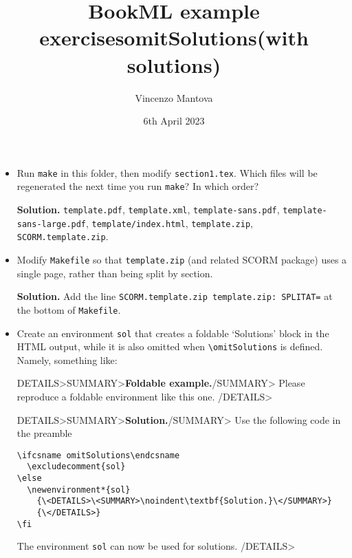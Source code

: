 \documentclass[oneside,11pt]{amsart}
\title{BookML example exercises\ifcsname omitSolutions\endcsname\else\space(with solutions)\fi}
\author{Vincenzo Mantova}
\date{6th April 2023}
\newenvironment*{sol}
    {\<DETAILS>\<SUMMARY>\noindent\textbf{Solution.}\</SUMMARY>}
    {\</DETAILS>}
\begin{document}
\maketitle

\begin{itemize}
  \item Run \texttt{make} in this folder, then modify \texttt{section1.tex}. Which files will be regenerated the next time you run \texttt{make}? In which order?

\begin{solution}
  \noindent\textbf{Solution.} \texttt{template.pdf}, \texttt{template.xml}, \texttt{template-sans.pdf}, \texttt{template-sans-large.pdf}, \texttt{template/index.html}, \texttt{template.zip}, \texttt{SCORM.template.zip}.
\end{solution}
  \item Modify \texttt{Makefile} so that \texttt{template.zip} (and related SCORM package) uses a single page, rather than being split by section.

\begin{solution}
  \noindent\textbf{Solution.} Add the line \texttt{SCORM.template.zip template.zip: SPLITAT=} at the bottom of \texttt{Makefile}.
\end{solution}

  \item Create an environment \texttt{sol} that creates a foldable `Solutions' block in the HTML output, while it is also omitted when \texttt{\textbackslash{}omitSolutions} is defined. Namely, something like:

\<DETAILS>\<SUMMARY>\noindent\textbf{Foldable example.}\</SUMMARY>
  Please reproduce a foldable environment like this one.
\</DETAILS>

\begin{sol}
  Use the following code in the preamble
  \begin{lstlisting}
\ifcsname omitSolutions\endcsname
  \excludecomment{sol}
\else
  \newenvironment*{sol}
    {\<DETAILS>\<SUMMARY>\noindent\textbf{Solution.}\</SUMMARY>}
    {\</DETAILS>}
\fi
  \end{lstlisting}
  The environment \texttt{sol} can now be used for solutions.
\end{sol}
\end{itemize}
\end{document}
